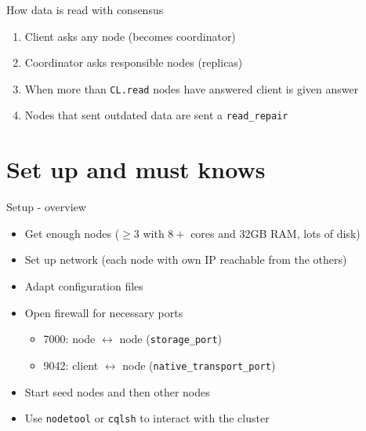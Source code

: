 \documentclass[
  10pt
]{beamer}
\begin{document}
\begin{frame}{How data is read with consensus}
  \begin{enumerate}
    \item<1-> Client asks any node (becomes coordinator)
    \item<2-> Coordinator asks responsible nodes (replicas)
    \item<3-> When more than \lstinline{CL.read} nodes have answered client is given answer
    \item<4-> Nodes that sent outdated data are sent a \lstinline{read_repair}
  \end{enumerate}
\end{frame}

\section{Set up and must knows}  %

\begin{frame}{Setup - overview}
  \begin{itemize}
    \item<1-> Get enough nodes ($\geq3$ with $8+$ cores and 32GB RAM, lots of disk)
    \item<2-> Set up network (each node with own IP reachable from the others)
    \item<3-> Adapt configuration files
    \item<4-> Open firewall for necessary ports
    \begin{itemize}
      \item 7000: node $\leftrightarrow$ node (\lstinline{storage_port})
      \item 9042: client $\leftrightarrow$ node (\lstinline{native_transport_port})
    \end{itemize}
    \item<5-> Start seed nodes and then other nodes
    \item<6-> Use \lstinline{nodetool} or \lstinline{cqlsh} to interact with the cluster
  \end{itemize}
\end{frame}
\end{document}
